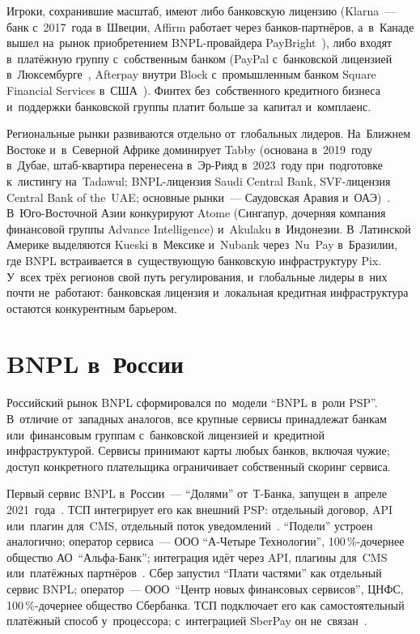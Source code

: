 Игроки, сохранившие масштаб, имеют либо банковскую лицензию (Klarna~--- банк
  с~2017~года в~Швеции, Affirm работает через банков-партнёров, а~в~Канаде
вышел на~рынок приобретением BNPL-провайдера PayBright~\cite{affirm-paybright-2021}),
либо входят в~платёжную группу с~собственным банком (PayPal с~банковской
  лицензией в~Люксембурге~\cite{paypal-eu-bank-licence}, Afterpay внутри Block
с~промышленным банком Square Financial Services в~США~\cite{fdic-square-ilc-2020}). Финтех
без~собственного кредитного бизнеса и~поддержки банковской группы платит
больше за~капитал и~комплаенс.

Региональные рынки развиваются отдельно от~глобальных лидеров. На~Ближнем Востоке
и~в~Северной Африке доминирует Tabby (основана в~2019~году в~Дубае,
  штаб-квартира перенесена в~Эр-Рияд в~2023~году при~подготовке к~листингу
  на~Tadawul; BNPL-лицензия Saudi Central Bank, SVF-лицензия Central Bank of
the~UAE; основные рынки~--- Саудовская Аравия и~ОАЭ)~\cite{tabby-sama,tabby-svf}.
В~Юго-Восточной Азии конкурируют Atome (Сингапур, дочерняя компания финансовой
группы Advance Intelligence) и~Akulaku в~Индонезии. В~Латинской Америке
выделяются Kueski в~Мексике и~Nubank через~Nu~Pay в~Бразилии, где BNPL
встраивается в~существующую банковскую инфраструктуру Pix. У~всех трёх
регионов свой путь регулирования, и~глобальные лидеры в~них почти не~работают:
банковская лицензия и~локальная кредитная инфраструктура остаются конкурентным
барьером.

\section{BNPL в~России}\label{sec:bnpl-russia}

Российский рынок BNPL сформировался по~модели \enquote{BNPL в~роли PSP}.
В~отличие от~западных аналогов, все крупные сервисы принадлежат банкам
или~финансовым группам с~банковской лицензией и~кредитной инфраструктурой.
Сервисы принимают карты любых банков, включая чужие; доступ конкретного
плательщика ограничивает собственный скоринг сервиса.

Первый сервис BNPL в~России~--- \enquote{Долями} от~Т-Банка, запущен в~апреле
2021~года~\cite{tbank-dolyame}. ТСП интегрирует его как внешний PSP: отдельный
договор, API или~плагин для~CMS, отдельный поток
уведомлений~\cite{tbank-dolyame-business}. \enquote{Подели} устроен аналогично;
оператор сервиса~--- ООО \enquote{А-Четыре Технологии}, 100\,\%-дочернее
общество АО~\enquote{Альфа-Банк}; интеграция идёт через API, плагины для~CMS
или~платёжных партнёров~\cite{alfa-podeli,alfa-podeli-business}. Сбер запустил
\enquote{Плати частями} как отдельный сервис BNPL; оператор~---
ООО~\enquote{Центр новых финансовых сервисов}, ЦНФС, 100\,\%-дочернее общество
Сбербанка. ТСП подключает его как самостоятельный платёжный способ
у~процессора; с~интеграцией SberPay он не~связан~\cite{sber-pay-parts}.

